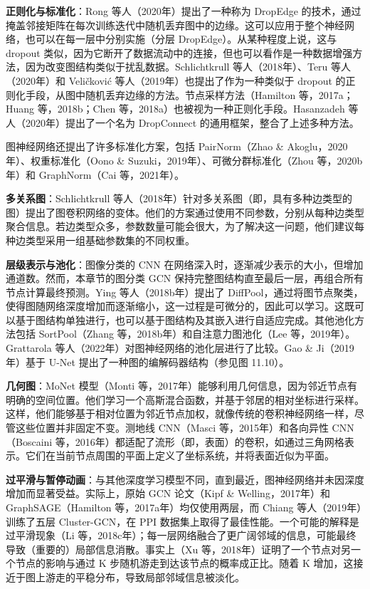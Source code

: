 \textbf{正则化与标准化}：Rong 等人（2020年）提出了一种称为 DropEdge 的技术，通过掩盖邻接矩阵在每次训练迭代中随机丢弃图中的边缘。这可以应用于整个神经网络，也可以在每一层中分别实施（分层 DropEdge）。从某种程度上说，这与 dropout 类似，因为它断开了数据流动中的连接，但也可以看作是一种数据增强方法，因为改变图结构类似于扰乱数据。Schlichtkrull 等人（2018年）、Teru 等人（2020年）和 Veličković 等人（2019年）也提出了作为一种类似于 dropout 的正则化手段，从图中随机丢弃边缘的方法。节点采样方法（Hamilton 等，2017a；Huang 等，2018b；Chen 等，2018a）也被视为一种正则化手段。Hasanzadeh 等人（2020年）提出了一个名为 DropConnect 的通用框架，整合了上述多种方法。

图神经网络还提出了许多标准化方案，包括 PairNorm（Zhao \& Akoglu，2020年）、权重标准化（Oono \& Suzuki，2019年）、可微分群标准化（Zhou 等，2020b年）和 GraphNorm（Cai 等，2021年）。

\textbf{多关系图}：Schlichtkrull 等人（2018年）针对多关系图（即，具有多种边类型的图）提出了图卷积网络的变体。他们的方案通过使用不同参数，分别从每种边类型聚合信息。若边类型众多，参数数量可能会很大，为了解决这一问题，他们建议每种边类型采用一组基础参数集的不同权重。

\textbf{层级表示与池化}：图像分类的 CNN 在网络深入时，逐渐减少表示的大小，但增加通道数。然而，本章节的图分类 GCN 保持完整图结构直至最后一层，再组合所有节点计算最终预测。Ying 等人（2018b年）提出了 DiffPool，通过将图节点聚类，使得图随网络深度增加而逐渐缩小，这一过程是可微分的，因此可以学习。这既可以基于图结构单独进行，也可以基于图结构及其嵌入进行自适应完成。其他池化方法包括 SortPool（Zhang 等，2018b年）和自注意力图池化（Lee 等，2019年）。Grattarola 等人（2022年）对图神经网络的池化层进行了比较。Gao \& Ji（2019年）基于 U-Net 提出了一种图的编解码器结构（参见图 11.10）。

\textbf{几何图}：MoNet 模型（Monti 等，2017年）能够利用几何信息，因为邻近节点有明确的空间位置。他们学习一个高斯混合函数，并基于邻居的相对坐标进行采样。这样，他们能够基于相对位置为邻近节点加权，就像传统的卷积神经网络一样，尽管这些位置并非固定不变。测地线 CNN（Masci 等，2015年）和各向异性 CNN（Boscaini 等，2016年）都适配了流形（即，表面）的卷积，如通过三角网格表示。它们在当前节点周围的平面上定义了坐标系统，并将表面近似为平面。

\textbf{过平滑与暂停动画}：与其他深度学习模型不同，直到最近，图神经网络并未因深度增加而显著受益。实际上，原始 GCN 论文（Kipf \& Welling，2017年）和 GraphSAGE（Hamilton 等，2017a年）均仅使用两层，而 Chiang 等人（2019年）训练了五层 Cluster-GCN，在 PPI 数据集上取得了最佳性能。一个可能的解释是过平滑现象（Li 等，2018c年）；每一层网络融合了更广阔邻域的信息，可能最终导致（重要的）局部信息消散。事实上（Xu 等，2018年）证明了一个节点对另一个节点的影响与通过 K 步随机游走到达该节点的概率成正比。随着 K 增加，这接近于图上游走的平稳分布，导致局部邻域信息被淡化。

